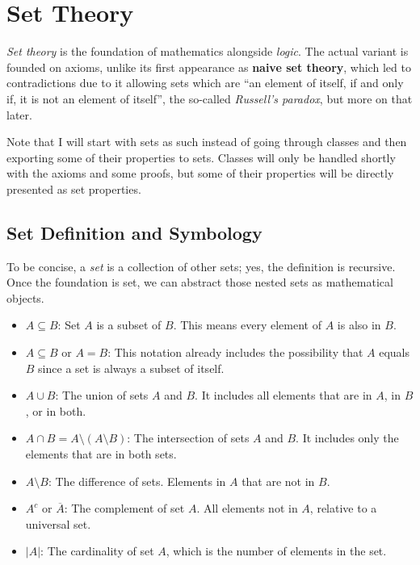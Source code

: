 \chapter{Set Theory}

\emph{Set theory} is the foundation of mathematics alongside \emph{logic}. The actual variant is founded on axioms, unlike
its first appearance as \textbf{naive set theory}, which led to contradictions due to it allowing sets which are
``an element of itself, if and only if, it is not an element of itself'', the so-called \emph{Russell's paradox}, but more
on that later.

Note that I will start with sets as such instead of going through classes and then exporting some of their
properties to sets. Classes will only be handled shortly with the axioms and some proofs, but some of their properties will be
directly presented as set properties.

\section{Set Definition and Symbology}

To be concise, a \emph{set} is a collection of other sets; yes, the definition is recursive. Once the foundation
is set, we can abstract those nested sets as mathematical objects.

\begin{itemize}

	\item \(A \subseteq B\): Set \(A\) is a subset of \(B\). This means every element of
	      \(A\) is also in \(B\).

	\item \(A \subseteq B\) or \(A = B\): This notation already includes the possibility that \(A\)
	      equals \(B\) since a set is always a subset of itself.

	\item \(A \cup B\): The union of sets \(A\) and \(B\). It includes all elements
	      that are in \(A\), in \(B\), or in both.

	\item \(A \cap B = A \setminus (A \setminus B)\): The intersection of sets \(A\) and \(B\). It includes only the elements
	      that are in both sets.

	\item \(A \setminus B\): The difference of sets. Elements in \(A\) that are not in \(B\).

	\item \(A^c\) or \(\overline{A}\): The complement of set \(A\). All elements not in \(A\),
	      relative to a universal set.

	\item \(|A|\): The cardinality of set \(A\), which is the number of elements in the set.

\end{itemize}

